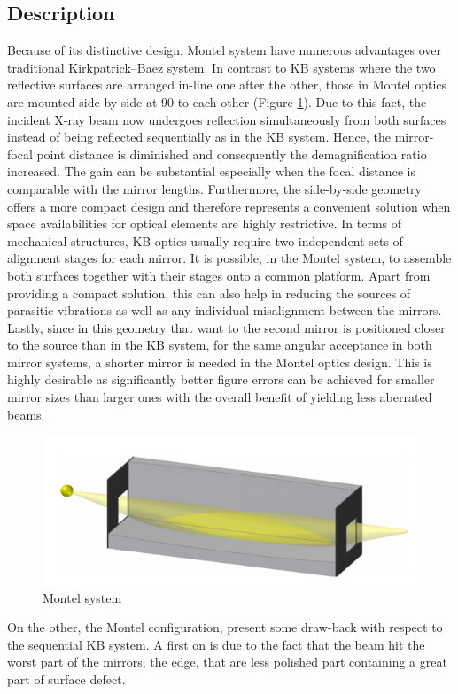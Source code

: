 \subsection{Description}
\hspace{10mm} Because of its distinctive design, Montel system have numerous advantages over traditional Kirkpatrick–Baez system. In contrast to KB systems where the two reflective surfaces are arranged in-line one after the other, those in Montel optics are mounted side by side at 90 to each other (Figure \ref{fig: MontelSystem1}). Due to this fact, the incident X-ray beam now undergoes reflection simultaneously from both surfaces instead of being reflected sequentially as in the KB system. Hence, the mirror-focal point distance is diminished and consequently the demagnification ratio increased. The gain can be substantial especially when the focal distance is comparable with the mirror lengths. Furthermore, the side-by-side geometry offers a more compact design and therefore represents a convenient solution when space availabilities for optical elements are highly restrictive. In terms of mechanical structures, KB optics usually require two independent sets of alignment stages for each mirror. It is possible, in the Montel system, to assemble both surfaces together with their stages onto a common platform. Apart from providing a compact solution, this can also help in reducing the sources of parasitic vibrations as well as any individual misalignment between the mirrors. Lastly, since in this geometry that want to the second mirror is positioned closer to the source than in the KB system, for the same angular acceptance in both mirror systems, a shorter mirror is needed in the Montel optics design. This is highly desirable as significantly better figure errors can be achieved for smaller mirror sizes than larger ones with the overall benefit of yielding less aberrated beams.
\begin{figure}[H]
%
\centering
%
\includegraphics[width=.6\textwidth]{Immagini/Chapter2/MontelSystem}
%
\caption{Montel system}
%
\label{fig: MontelSystem1}
%
\end{figure}
%
\noindent On the other, the Montel configuration, present some draw-back with respect to the sequential KB system. A first on is due to the fact that the beam hit the worst part of the mirrors, the edge, that are less polished part containing a great part of surface defect.

